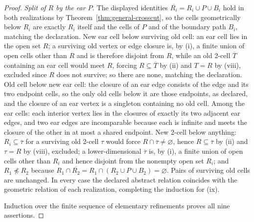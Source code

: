 \documentclass[11pt]{article}
\theoremstyle{mainplain}
\theoremstyle{mainroman}
\theoremstyle{definition}
\numberwithin{equation}{section}
\begin{document}
\begin{proof}
\emph{Split of \(R\) by the ear \(P\).} The displayed identities
\(\overline{R_i}=R_i\cup P\cup B_i\) hold in both realizations by
Theorem~\ref{thm:general-crosscut}, so the cells geometrically below
\(R_i\) are exactly \(R_i\) itself and the cells of \(P\) and of the
boundary path \(B_i\), matching the declaration. New ear cell below
surviving old cell: an ear cell lies in the open set \(R\); a
surviving old vertex or edge closure is, by (i), a finite union of
open cells other than \(R\) and is therefore disjoint from \(R\),
while an old 2-cell \(\overline T\) containing an ear cell would meet
\(R\), forcing \(R\subseteq\overline T\) by (ii) and \(T=R\) by
(viii), excluded since \(R\) does not survive; so there are none,
matching the declaration. Old cell below new ear cell: the closure of
an ear edge consists of the edge and its two endpoint cells, so the
only old cells below it are those endpoints, as declared, and the
closure of an ear vertex is a singleton containing no old cell. Among
the ear cells: each interior vertex lies in the closures of exactly
its two adjacent ear edges, and two ear edges are incomparable because
each is infinite and meets the closure of the other in at most a
shared endpoint. New 2-cell below anything:
\(R_i\subseteq\overline\tau\) for a surviving old 2-cell \(\tau\)
would force \(R\cap\overline\tau\ne\varnothing\), hence
\(R\subseteq\overline\tau\) by (ii) and \(\tau=R\) by (viii),
excluded; a lower-dimensional \(\overline\tau\) is, by (i), a finite
union of open cells other than \(R_i\) and hence disjoint from the
nonempty open set \(R_i\); and \(R_1\not\preceq R_2\) because
\(R_1\cap\overline{R_2}=R_1\cap(R_2\cup P\cup B_2)=\varnothing\).
Pairs of surviving old cells are unchanged. In every case the declared
abstract relation coincides with the geometric relation of each
realization, completing the induction for (ix).

Induction over the finite sequence of elementary refinements proves all nine assertions.
\end{proof}
\end{document}
